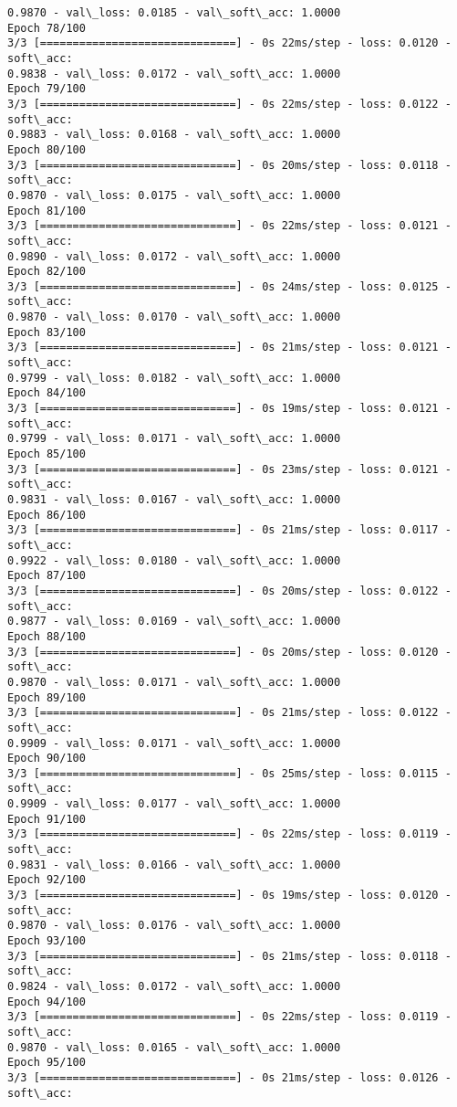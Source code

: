 \documentclass[11pt]{article}
\begin{document}
\begin{Verbatim}[commandchars=\\\{\}]
0.9870 - val\_loss: 0.0185 - val\_soft\_acc: 1.0000
Epoch 78/100
3/3 [==============================] - 0s 22ms/step - loss: 0.0120 - soft\_acc:
0.9838 - val\_loss: 0.0172 - val\_soft\_acc: 1.0000
Epoch 79/100
3/3 [==============================] - 0s 22ms/step - loss: 0.0122 - soft\_acc:
0.9883 - val\_loss: 0.0168 - val\_soft\_acc: 1.0000
Epoch 80/100
3/3 [==============================] - 0s 20ms/step - loss: 0.0118 - soft\_acc:
0.9870 - val\_loss: 0.0175 - val\_soft\_acc: 1.0000
Epoch 81/100
3/3 [==============================] - 0s 22ms/step - loss: 0.0121 - soft\_acc:
0.9890 - val\_loss: 0.0172 - val\_soft\_acc: 1.0000
Epoch 82/100
3/3 [==============================] - 0s 24ms/step - loss: 0.0125 - soft\_acc:
0.9870 - val\_loss: 0.0170 - val\_soft\_acc: 1.0000
Epoch 83/100
3/3 [==============================] - 0s 21ms/step - loss: 0.0121 - soft\_acc:
0.9799 - val\_loss: 0.0182 - val\_soft\_acc: 1.0000
Epoch 84/100
3/3 [==============================] - 0s 19ms/step - loss: 0.0121 - soft\_acc:
0.9799 - val\_loss: 0.0171 - val\_soft\_acc: 1.0000
Epoch 85/100
3/3 [==============================] - 0s 23ms/step - loss: 0.0121 - soft\_acc:
0.9831 - val\_loss: 0.0167 - val\_soft\_acc: 1.0000
Epoch 86/100
3/3 [==============================] - 0s 21ms/step - loss: 0.0117 - soft\_acc:
0.9922 - val\_loss: 0.0180 - val\_soft\_acc: 1.0000
Epoch 87/100
3/3 [==============================] - 0s 20ms/step - loss: 0.0122 - soft\_acc:
0.9877 - val\_loss: 0.0169 - val\_soft\_acc: 1.0000
Epoch 88/100
3/3 [==============================] - 0s 20ms/step - loss: 0.0120 - soft\_acc:
0.9870 - val\_loss: 0.0171 - val\_soft\_acc: 1.0000
Epoch 89/100
3/3 [==============================] - 0s 21ms/step - loss: 0.0122 - soft\_acc:
0.9909 - val\_loss: 0.0171 - val\_soft\_acc: 1.0000
Epoch 90/100
3/3 [==============================] - 0s 25ms/step - loss: 0.0115 - soft\_acc:
0.9909 - val\_loss: 0.0177 - val\_soft\_acc: 1.0000
Epoch 91/100
3/3 [==============================] - 0s 22ms/step - loss: 0.0119 - soft\_acc:
0.9831 - val\_loss: 0.0166 - val\_soft\_acc: 1.0000
Epoch 92/100
3/3 [==============================] - 0s 19ms/step - loss: 0.0120 - soft\_acc:
0.9870 - val\_loss: 0.0176 - val\_soft\_acc: 1.0000
Epoch 93/100
3/3 [==============================] - 0s 21ms/step - loss: 0.0118 - soft\_acc:
0.9824 - val\_loss: 0.0172 - val\_soft\_acc: 1.0000
Epoch 94/100
3/3 [==============================] - 0s 22ms/step - loss: 0.0119 - soft\_acc:
0.9870 - val\_loss: 0.0165 - val\_soft\_acc: 1.0000
Epoch 95/100
3/3 [==============================] - 0s 21ms/step - loss: 0.0126 - soft\_acc:

\end{Verbatim}
\end{document}
